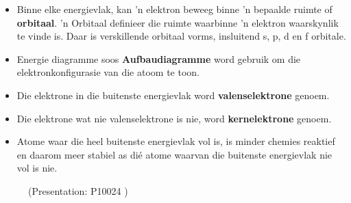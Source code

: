 \begin{itemize}[noitemsep]
\item Binne elke energievlak, kan 'n elektron beweeg binne 'n bepaalde ruimte of \textbf{orbitaal}. 'n Orbitaal definieer die ruimte waarbinne 'n elektron waarskynlik te vinde is. Daar is verskillende orbitaal vorms, insluitend s, p, d en f orbitale.
\item Energie diagramme soos \textbf{Aufbaudiagramme} word gebruik om die elektronkonfigurasie van die atoom te toon.
\item Die elektrone in die buitenste energievlak word \textbf{valenselektrone} genoem.
\item Die elektrone wat nie valenselektrone is nie, word \textbf{kernelektrone} genoem.
\item Atome waar die heel buitenste energievlak vol is, is minder chemies reaktief en daarom meer stabiel as dié atome waarvan die buitenste energievlak nie vol is nie.
\end{itemize}

    \setcounter{subfigure}{0}
	\begin{figure}[H] %
    \label{m38741*slideshareflash2}
             { (Presentation:  P10024 )}
 \end{figure}       \par 
            

